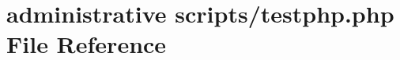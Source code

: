 \hypertarget{testphp_8php}{}\section{administrative scripts/testphp.php File Reference}
\label{testphp_8php}

